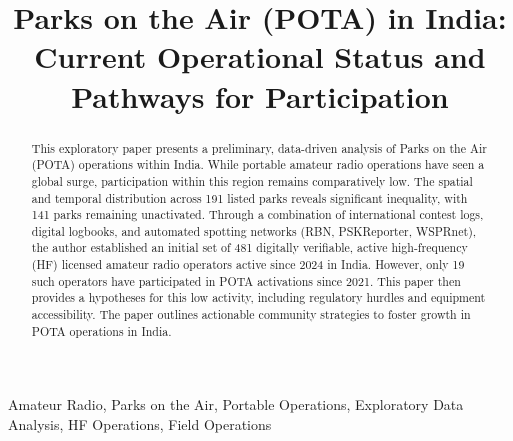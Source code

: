 \documentclass[conference]{IEEEtran}
\begin{document}
\title{Parks on the Air (POTA) in India: Current Operational Status and Pathways for Participation}

\author{
}

\maketitle
{}
\IEEEpubidadjcol

\begin{abstract}
This exploratory paper presents a preliminary, data-driven analysis of
Parks on the Air (POTA) operations within India. While portable
amateur radio operations have seen a global surge, participation
within this region remains comparatively low. The spatial and temporal
distribution across 191 listed parks reveals significant inequality,
with 141 parks remaining unactivated. Through a combination of
international contest logs, digital logbooks, and automated spotting
networks (RBN, PSKReporter, WSPRnet), the author established an
initial set of 481 digitally verifiable, active high-frequency (HF)
licensed amateur radio operators active since 2024 in India. However,
only 19 such operators have participated in POTA activations since
2021. This paper then provides a hypotheses for this low activity,
including regulatory hurdles and equipment accessibility. The paper
outlines actionable community strategies to foster growth in POTA
operations in India.
\end{abstract}

\begin{IEEEkeywords}
Amateur Radio, Parks on the Air, Portable Operations, Exploratory Data
Analysis, HF Operations, Field Operations
\end{IEEEkeywords}
\end{document}
